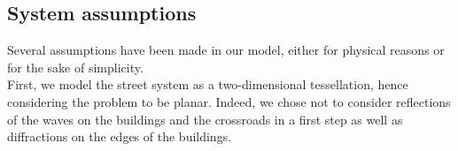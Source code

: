 \documentclass[conference]{IEEEtran}
\begin{document}
\subsection{System assumptions}
\label{assumption}
Several assumptions have been made in our model, either for physical reasons or for the sake of simplicity.  \\
\indent First, we model the street system as a two-dimensional tessellation, hence considering the problem to be planar. Indeed, we chose not to consider reflections of the waves on the buildings and the crossroads in a first step as well as diffractions on the edges of the buildings.\\
\end{document}
